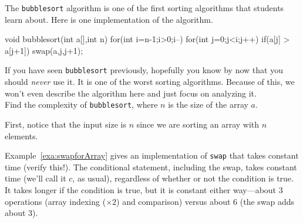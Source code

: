\begin{exa}\label{exa:bubble}
The \verb+bubblesort+ algorithm is one of the first sorting algorithms that students learn about.
Here is one implementation of the algorithm.
\begin{code}
    void bubblesort(int a[],int n) {
        for(int i=n-1;i>0;i--) {
            for(int j=0;j<i;j++) {
                if(a[j] > a[j+1]) {
                    swap(a,j,j+1);
                }
            }
        }
    }
    
\end{code}
If you have seen \verb+bubblesort+ previously, 
hopefully you know by now that you should {\em never} use it.
It is one of the worst sorting algorithms. 
Because of this, we won't even describe the algorithm here and just focus on analyzing it.\\

Find the complexity of \verb+bubblesort+, where $n$ is the size of the array $a$.
\begin{sol}
First, notice that the input size is $n$ since we are sorting an array 
with $n$ elements.

Example~\ref{exa:swapforArray} gives an implementation of \verb+swap+
that takes constant time (verify this!).  The conditional statement,
including the swap, takes constant time (we'll call it $c$, as usual), 
regardless of whether or not
the condition is true.  It takes longer if the condition is true, but
it is constant either way---about $3$ operations (array indexing ($\times 2$) and
comparison) versus about $6$ (the swap adds about $3$).


\end{sol}
\end{exa}
